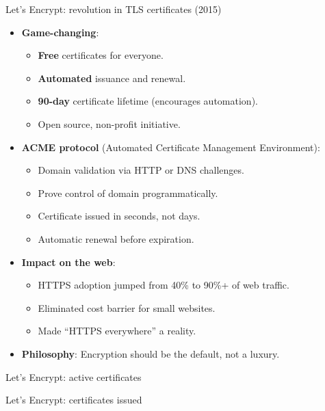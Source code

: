 \documentclass[aspectratio=169, lualatex, handout]{beamer}
\begin{document}
\begin{frame}{Let's Encrypt: revolution in TLS certificates (2015)}
	\begin{itemize}[<+->]
		\item \textbf{Game-changing}:
		      \begin{itemize}
			      \item \textbf{Free} certificates for everyone.
			      \item \textbf{Automated} issuance and renewal.
			      \item \textbf{90-day} certificate lifetime (encourages automation).
			      \item Open source, non-profit initiative.
		      \end{itemize}
		\item \textbf{ACME protocol} (Automated Certificate Management Environment):
		      \begin{itemize}
			      \item Domain validation via HTTP or DNS challenges.
			      \item Prove control of domain programmatically.
			      \item Certificate issued in seconds, not days.
			      \item Automatic renewal before expiration.
		      \end{itemize}
		\item \textbf{Impact on the web}:
		      \begin{itemize}
			      \item HTTPS adoption jumped from 40\% to 90\%+ of web traffic.
			      \item Eliminated cost barrier for small websites.
			      \item Made ``HTTPS everywhere'' a reality.
		      \end{itemize}
		\item \textbf{Philosophy}: Encryption should be the default, not a luxury.
	\end{itemize}
\end{frame}

\begin{frame}{Let's Encrypt: active certificates}
\end{frame}

\begin{frame}{Let's Encrypt: certificates issued}
\end{frame}
\end{document}
